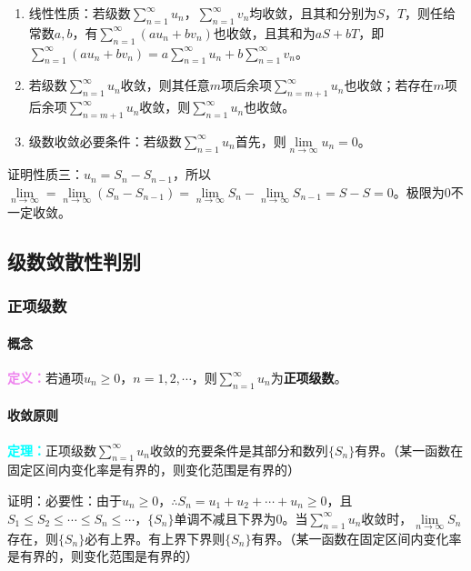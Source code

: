 \documentclass[UTF8, 12pt]{ctexart}
\begin{document}
\begin{enumerate}
    \item 线性性质：若级数$\sum\limits_{n=1}^\infty u_n$，$\sum\limits_{n=1}^\infty v_n$均收敛，且其和分别为$S$，$T$，则任给常数$a,b$，有$\sum\limits_{n=1}^\infty(au_n+bv_n)$也收敛，且其和为$aS+bT$，即$\sum\limits_{n=1}^\infty(au_n+bv_n)=a\sum\limits_{n=1}^\infty u_n+b\sum\limits_{n=1}^\infty v_n$。
    \item 若级数$\sum\limits_{n=1}^\infty u_n$收敛，则其任意$m$项后余项$\sum\limits_{n=m+1}^\infty u_n$也收敛；若存在$m$项后余项$\sum\limits_{n=m+1}^\infty u_n$收敛，则$\sum\limits_{n=1}^\infty u_n$也收敛。
    \item 级数收敛必要条件：若级数$\sum\limits_{n=1}^\infty u_n$首先，则$\lim\limits_{n\to\infty}u_n=0$。
\end{enumerate}

证明性质三：$u_n=S_n-S_{n-1}$，所以$\lim\limits_{n\to\infty}=\lim\limits_{n\to\infty}(S_n-S_{n-1})=\lim\limits_{n\to\infty}S_n-\lim\limits_{n\to\infty}S_{n-1}=S-S=0$。极限为0不一定收敛。

\subsection{级数敛散性判别}

\subsubsection{正项级数}

\paragraph{概念} \leavevmode \medskip

\textcolor{violet}{\textbf{定义：}}若通项$u_n\geqslant0$，$n=1,2,\cdots$，则$\sum\limits_{n=1}^\infty u_n$为\textbf{正项级数}。

\paragraph{收敛原则} \leavevmode \medskip

\textcolor{aqua}{\textbf{定理：}}正项级数$\sum\limits_{n=1}^\infty u_n$收敛的充要条件是其部分和数列$\{S_n\}$有界。（某一函数在固定区间内变化率是有界的，则变化范围是有界的）

证明：必要性：由于$u_n\geqslant0$，$\therefore S_n=u_1+u_2+\cdots+u_n\geqslant0$，且$S_1\leqslant S_2\leqslant\cdots\leqslant S_n\leqslant\cdots$，$\{S_n\}$单调不减且下界为0。当$\sum\limits_{n=1}^\infty u_n$收敛时，$\lim\limits_{n\to\infty}S_n$存在，则$\{S_n\}$必有上界。有上界下界则$\{S_n\}$有界。（某一函数在固定区间内变化率是有界的，则变化范围是有界的）
\end{document}
